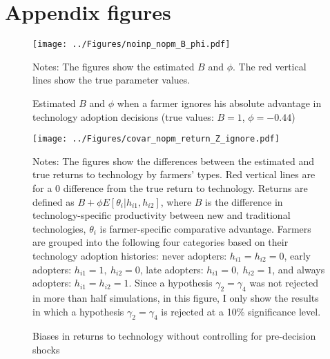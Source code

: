 \documentclass[11pt,letterpaper]{article}
\begin{document}
\appendix

  

\setcounter{figure}{0}
\setcounter{table}{0}
\renewcommand\thefigure{\Alph{section}.\arabic{figure}}
\renewcommand\thetable{\Alph{section}.\arabic{table}}
  
\section{Appendix figures}\label{sec:appendix_figure}

\begin{figure}[H]
  \centering
  \caption{Estimated $B$ and $\phi$ when a farmer ignores his absolute advantage in technology adoption decisions (true values: $B = 1$, $\phi = -0.44$)}
  \texttt{[image: ../Figures/noinp\_nopm\_B\_phi.pdf]}
  \label{fig:noinp_nopm_B_phi}
  \footnotesize
  \begin{tablenotes}
    \item Notes:
      The figures show the estimated $B$ and $\phi$.
      The red vertical lines show the true parameter values.
  \end{tablenotes}
\end{figure}

\begin{figure}[H]
  \centering
  \caption{Biases in returns to technology without controlling for pre-decision shocks}
  \texttt{[image: ../Figures/covar\_nopm\_return\_Z\_ignore.pdf]}
  \label{fig:covar_nopm_return_Z_ignore}
  \footnotesize
  \begin{tablenotes}
    \item Notes:
      The figures show the differences between the estimated and true returns to technology by farmers' types.
      Red vertical lines are for a 0 difference from the true return to technology.
      Returns are defined as $B + \phi E[\theta_i | h_{i1}, h_{i2}]$, where $B$ is the difference in technology-specific productivity between new and traditional technologies, $\theta_i$ is farmer-specific comparative advantage.
      Farmers are grouped into the following four categories based on their technology adoption histories:
      never adopters: $h_{i1} = h_{i2} = 0$, 
      early adopters: $h_{i1} = 1, \ h_{i2} = 0$, 
      late adopters: $h_{i1} = 0, \ h_{i2} = 1$, and
      always adopters: $h_{i1} = h_{i2} = 1$.
      Since a hypothesis $\gamma_2 = \gamma_4$ was not rejected in more than half simulations, in this figure, I only show the results in which a hypothesis $\gamma_2 = \gamma_4$ is rejected at a 10\% significance level.
  \end{tablenotes}
\end{figure}
\end{document}

